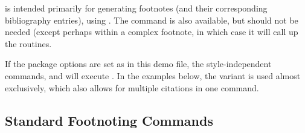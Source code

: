 \documentclass{ltxdockit}[2010/02/12]
\begin{document}
 is intended primarily for generating footnotes (and their corresponding bibliography entries), using . The  command is also available, but should not be needed (except perhaps within a complex footnote, in which case it will call up the  routines. 

If the package options are set as in this demo file, the style-independent commands,  and   will execute . In the examples below, the variant  is used almost exclusively, which also allows for multiple citations in one command.

\subsection{Standard Footnoting Commands}
\end{document}
